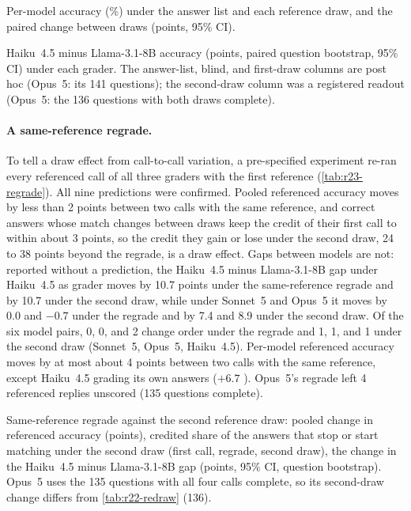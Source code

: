 \begin{table}[htbp]
\centering
\caption{Per-model accuracy (\%) under the answer list and each reference draw, and the paired change between draws (points, 95\% CI).\pre}
\label{tab:r22-redraw-models}
\footnotesize

\end{table}

\begin{table}[htbp]
\centering
\caption{Haiku~4.5 minus Llama-3.1-8B accuracy (points, paired question bootstrap, 95\% CI) under each grader. The answer-list, blind, and first-draw columns are post hoc (Opus~5: its 141 questions); the second-draw column was a registered readout (Opus~5: the 136 questions with both draws complete).}
\label{tab:r22-haiku-llama}
\footnotesize

\end{table}

\paragraph{A same-reference regrade.}
To tell a draw effect from call-to-call variation, a pre-specified experiment re-ran every referenced call of all three graders with the first reference (\cref{tab:r23-regrade}). All nine predictions were confirmed. Pooled referenced accuracy moves by less than 2 points between two calls with the same reference, and correct answers whose match changes between draws keep the credit of their first call to within about 3 points, so the credit they gain or lose under the second draw, 24 to 38 points beyond the regrade, is a draw effect. Gaps between models are not: reported without a prediction, the Haiku~4.5 minus Llama-3.1-8B gap under Haiku~4.5 as grader moves by 10.7 points under the same-reference regrade  and by 10.7 under the second draw, while under Sonnet~5 and Opus~5 it moves by 0.0 and $-0.7$ under the regrade and by 7.4 and 8.9 under the second draw. Of the six model pairs, 0, 0, and 2 change order under the regrade and 1, 1, and 1 under the second draw (Sonnet~5, Opus~5, Haiku~4.5). Per-model referenced accuracy moves by at most about 4 points between two calls with the same reference, except Haiku~4.5 grading its own answers ($+6.7$ ). Opus~5's regrade left 4 referenced replies unscored (135 questions complete).

\begin{table}[htbp]
\centering
\caption{Same-reference regrade against the second reference draw: pooled change in referenced accuracy (points), credited share of the answers that stop or start matching under the second draw (first call, regrade, second draw), the change in the Haiku~4.5 minus Llama-3.1-8B gap (points, 95\% CI, question bootstrap). Opus~5 uses the 135 questions with all four calls complete, so its second-draw change differs from \cref{tab:r22-redraw} (136).\pre}
\label{tab:r23-regrade}
\footnotesize
\setlength{\tabcolsep}{2pt}
\begin{adjustbox}{max width=\linewidth}\end{adjustbox}
\end{table}

